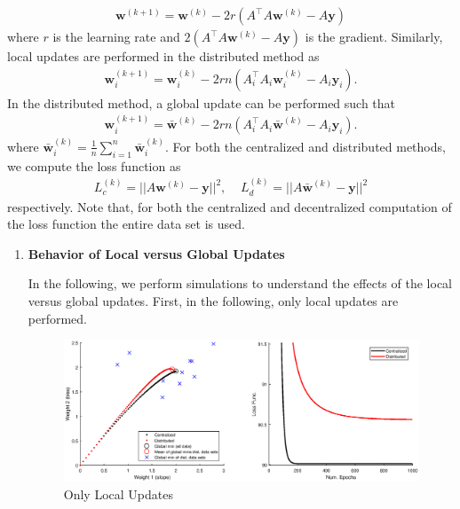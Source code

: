 \documentclass[11pt, fullpage,letterpaper]{article}
\newcommand{\tbf}{\textbf}
\begin{document}
\begin{enumerate}
\begin{align}
\boldsymbol{w}^{(k+1)} = \boldsymbol{w}^{(k)} - 2r(A^\intercal A \boldsymbol{w}^{(k)} - A \boldsymbol{y})
\end{align}
where $r$ is the learning rate and $2(A^\intercal A \boldsymbol{w}^{(k)} - A \boldsymbol{y})$ is the gradient. Similarly, local updates are performed in the distributed method as
\begin{align}
\boldsymbol{w}_i^{(k+1)} = \boldsymbol{w}_i^{(k)} - 2rn(A_i^\intercal A_i \boldsymbol{w}_i^{(k)} - A_i \boldsymbol{y}_i).
\end{align}
In the distributed method, a global update can be performed such that
\begin{align}
\boldsymbol{w}_i^{(k+1)} = \bar{\boldsymbol{w}}^{(k)} - 2rn(A_i^\intercal A_i \boldsymbol\bar{\boldsymbol{w}}^{(k)} - A_i \boldsymbol{y}_i).
\end{align}
where $\bar{\boldsymbol{w}}_i^{(k)} =\frac{1}{n}\sum_{i=1}^{n}\bar{\boldsymbol{w}}_i^{(k)}$. For both the centralized and distributed methods, we compute the loss function as
\begin{align}
L_c^{(k)} = ||A\boldsymbol{w}^{(k)} - \boldsymbol{y}||^2, \;\;\;\; L_d^{(k)} = ||A\boldsymbol\bar{\boldsymbol{w}}^{(k)} - \boldsymbol{y}||^2
\end{align}
respectively. Note that, for both the centralized and decentralized computation of the loss function the entire data set is used.
\begin{enumerate}

  \item \tbf{Behavior of Local versus Global Updates}

  In the following, we perform simulations to understand the effects of the local versus global updates. First, in the following, only local updates are performed.

  \begin{figure}[H]
\begin{center}
\advance\leftskip-3cm
\advance\rightskip-3cm
\includegraphics[width=20cm]{LocalUpdates.eps}
\caption{Only Local Updates}
\end{center}\end{figure}


\end{enumerate}
\end{enumerate}
\end{document}
